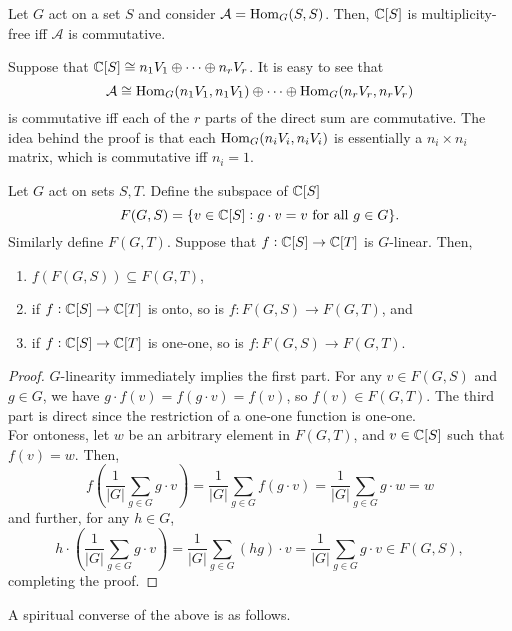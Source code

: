 	\begin{flem}
		\label{lem:multiplicity-free}
		Let $G$ act on a set $S$ and consider $\mathcal{A} = \operatorname{Hom}_G(S,S)$. Then, $\mathbb{C}[S]$ is multiplicity-free iff $\mathcal{A}$ is commutative.
	\end{flem}
	Suppose that $\mathbb{C}[S] \cong n_1 V_1 \oplus \cdots \oplus n_r V_r$. It is easy to see that
	\[ \mathcal{A} \cong \operatorname{Hom}_G(n_1 V_1, n_1 V_1) \oplus \cdots \oplus \operatorname{Hom}_G(n_r V_r, n_r V_r) \]
	is commutative iff each of the $r$ parts of the direct sum are commutative. The idea behind the proof is that each $\operatorname{Hom}_G(n_i V_i, n_i V_i)$ is essentially a $n_i \times n_i$ matrix, which is commutative iff $n_i = 1$.

	\begin{flem}
		Let $G$ act on sets $S,T$. Define the subspace of $\mathbb{C}[S]$
		\[ F(G,S) = \{v \in \mathbb{C}[S] : g \cdot v = v \text{ for all } g \in G \}. \]
		Similarly define $F(G,T)$. Suppose that $f : \mathbb{C}[S] \to \mathbb{C}[T]$ is $G$-linear. Then,
		\begin{enumerate}[label=(\alph*)]
			\item $f(F(G,S)) \subseteq F(G,T)$,
			\item if $f : \mathbb{C}[S] \to \mathbb{C}[T]$ is onto, so is $f : F(G,S) \to F(G,T)$, and
			\item if $f : \mathbb{C}[S] \to \mathbb{C}[T]$ is one-one, so is $f : F(G,S) \to F(G,T)$. 
		\end{enumerate}
	\end{flem}
	\begin{proof}
		$G$-linearity immediately implies the first part. For any $v \in F(G,S)$ and $g \in G$, we have $g \cdot f(v) = f(g \cdot v) = f(v)$, so $f(v) \in F(G,T)$. The third part is direct since the restriction of a one-one function is one-one.\\
		For ontoness, let $w$ be an arbitrary element in $F(G,T)$, and $v \in \mathbb{C}[S]$ such that $f(v) = w$. Then,
		\[ f\left(\frac{1}{|G|} \sum_{g \in G} g \cdot v\right) = \frac{1}{|G|} \sum_{g \in G} f(g \cdot v) = \frac{1}{|G|} \sum_{g \in G} g \cdot w = w \]
		and further, for any $h \in G$,
		\[ h \cdot \left(\frac{1}{|G|} \sum_{g \in G} g \cdot v\right) = \frac{1}{|G|} \sum_{g \in G} (hg) \cdot v = \frac{1}{|G|} \sum_{g \in G} g \cdot v \in F(G,S), \]
		completing the proof.
	\end{proof}

	A spiritual converse of the above is as follows.


